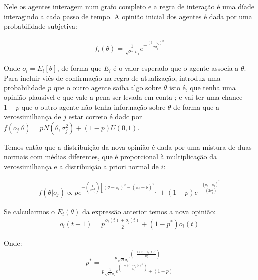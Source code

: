 Nele os agentes interagem num grafo completo e a regra de interação é uma díade
interagindo a cada passo de tempo. A opinião inicial dos agentes é dada por uma
probabilidade subjetiva:


\begin{align}
f_i(\theta) = \frac{1}{\sqrt{2 \pi} \sigma_i} e^{-
  \frac{(\theta - o_i )^2}{2 \sigma_i}}
  \end{align}

  Onde \(o_i = E_i[\theta] \), de forma que \(E_i\) é o valor esperado que o agente
  associa a \(\theta\). Para incluir viés de confirmação na regra de atualização,
   introduz uma probabilidade \(p\) que o outro
  agente saiba algo sobre $\theta$ isto é, que tenha uma opinião plausível e que vale
  a pena ser levada em conta ; e vai ter uma chance \(1 - p\) que o outro agente
  não tenha informação sobre $\theta$ de forma que a verossimilhança de $j$ estar
  correto é dado por $ f(o_j|\theta) = p N(\theta,\sigma_j^2) + (1-p)U(0,1)$.

  Temos então que a distribuição da nova opinião é dada por uma mistura de duas
  normais com médias diferentes, que é proporcional à  multiplicação da
  verossimilhança e a distribuição a priori normal de $i$:
  
  \begin{align}
    f(\theta | o_j)
    \propto 
    p
    e^
    {-(\frac{1}{2\sigma_i^2})
    [(\theta - o_i)^2
    +
    (o_j - \theta )^2
    ]}
    +
    (1-p)
    e^{-\frac{(o_i - o_j)^2}{(2 \sigma_i^2)}}
  \end{align}

 Se calcularmos o $E_i(\theta)$ da expressão anterior temos a nova opinião:
  \begin{align}
    o_i(t+1)
    =
    p
    \frac{o_i(t) + o_j(t)}{2}
    +
    (1-p^*)o_i(t)
  \end{align}

  Onde:
  \begin{align}
    p^*
    =
    \frac{
      p \frac{1}{\sqrt{2 \pi} \sigma_i}
      e^{(- \frac{o_i (t) - o_j (t))^2}{2 \sigma_i^2})}
    }{
      p
      \frac{1}{\sqrt{2 \pi} \sigma_i}
    e^{(- \frac{o_i (t) - o_j (t))^2}{2 \sigma_i^2})}
    +
    (1 - p)
    }
  \end{align}

